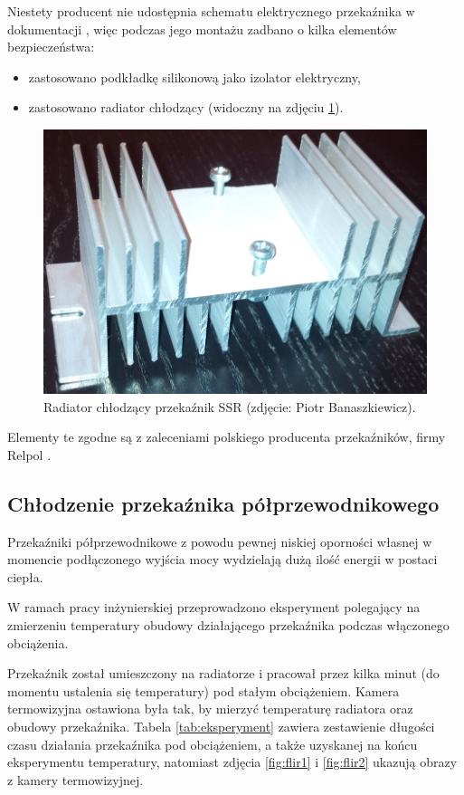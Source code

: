 Niestety producent nie udostępnia schematu elektrycznego przekaźnika w dokumentacji \cite{ASR90DDH}, więc podczas jego montażu zadbano o kilka elementów bezpieczeństwa:

\begin{itemize}
\item zastosowano podkładkę silikonową jako izolator elektryczny,
\item zastosowano radiator chłodzący (widoczny na zdjęciu \ref{fig:radiator}).
\end{itemize}

\begin{figure}[h]
	\centering
	\includegraphics[scale=0.35]{pics/radiator.jpg}
	\caption{\label{fig:radiator}Radiator chłodzący przekaźnik SSR (zdjęcie: Piotr Banaszkiewicz).}
\end{figure}

Elementy te zgodne są z zaleceniami polskiego producenta przekaźników, firmy Relpol \cite{RELPOL}.

\subsection{Chłodzenie przekaźnika półprzewodnikowego}
\label{subsec:chlodzenie_SSR}

Przekaźniki półprzewodnikowe z powodu pewnej niskiej oporności własnej w momencie podłączonego wyjścia mocy wydzielają dużą ilość energii w postaci ciepła.

W ramach pracy inżynierskiej przeprowadzono eksperyment polegający na zmierzeniu temperatury obudowy działającego przekaźnika podczas włączonego obciążenia.

Przekaźnik został umieszczony na radiatorze i pracował przez kilka minut (do momentu ustalenia się temperatury) pod stałym obciążeniem. Kamera termowizyjna ostawiona była tak, by mierzyć temperaturę radiatora oraz obudowy przekaźnika. Tabela \ref{tab:eksperyment} zawiera zestawienie długości czasu działania przekaźnika pod obciążeniem, a także uzyskanej na końcu eksperymentu temperatury, natomiast zdjęcia \ref{fig:flir1} i \ref{fig:flir2} ukazują obrazy z kamery termowizyjnej.

